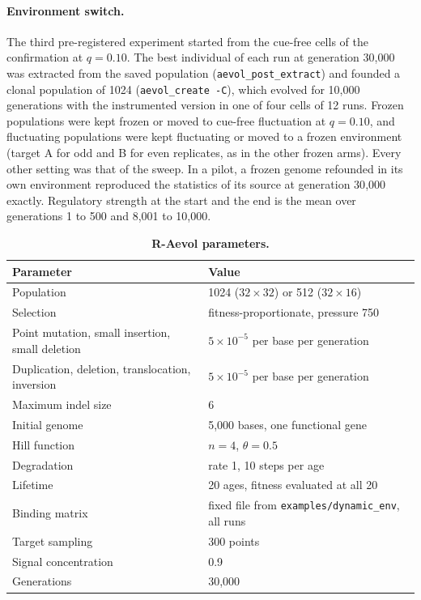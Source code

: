 \documentclass[10pt,letterpaper]{article}
\begin{document}
\paragraph*{Environment switch.} The third pre-registered experiment started from
the cue-free cells of the confirmation at $q=0.10$. The best individual of each
run at generation 30{,}000 was extracted from the saved population
(\texttt{aevol\_post\_extract}) and founded a clonal population of 1024
(\texttt{aevol\_create -C}), which evolved for 10{,}000 generations with the
instrumented version in one of four cells of 12 runs. Frozen populations were kept
frozen or moved to cue-free fluctuation at $q=0.10$, and fluctuating populations
were kept fluctuating or moved to a frozen environment (target A for odd and B for even
replicates, as in the other frozen arms). Every other setting was that of the
sweep. In a pilot, a frozen genome refounded in its own environment reproduced
the statistics of its source at generation 30{,}000 exactly. Regulatory strength
at the start and the end is the mean over generations 1 to 500 and 8{,}001 to
10{,}000.

\begin{table}[!ht]
\centering
\caption{{\bf R-Aevol parameters.}}
\begin{tabular}{@{}ll@{}}
\toprule
Parameter & Value \\
\midrule
Population & 1024 ($32\times32$) or 512 ($32\times16$) \\
Selection & fitness-proportionate, pressure 750 \\
Point mutation, small insertion, small deletion & $5\times10^{-5}$ per base per generation \\
Duplication, deletion, translocation, inversion & $5\times10^{-5}$ per base per generation \\
Maximum indel size & 6 \\
Initial genome & 5{,}000 bases, one functional gene \\
Hill function & $n=4$, $\theta=0.5$ \\
Degradation & rate 1, 10 steps per age \\
Lifetime & 20 ages, fitness evaluated at all 20 \\
Binding matrix & fixed file from \texttt{examples/dynamic\_env}, all runs \\
Target sampling & 300 points \\
Signal concentration & 0.9 \\
Generations & 30{,}000 \\
\bottomrule
\end{tabular}
\label{tab_params}
\end{table}
\end{document}
